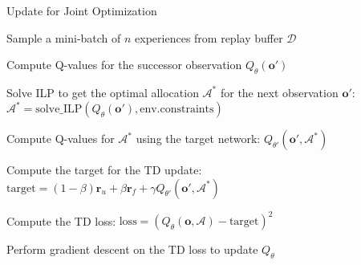 \begin{algorithm}[t]
\caption{Update for Joint Optimization}
\label{alg:JOUpdate}
\begin{algorithmic}[1]

    \State Sample a mini-batch of $n$ experiences from replay buffer $\mathcal{D}$
    
        \State Compute Q-values for the successor observation $Q_\theta(\mathbf{o}')$
        
        \State Solve ILP to get the optimal allocation $\mathcal{A}^*$ for the next observation $\mathbf{o}'$:
        \State \hspace{1em} $\mathcal{A}^* = \text{solve\_ILP}(Q_\theta(\mathbf{o}'), \text{env.constraints})$
        
        \State Compute Q-values for $\mathcal{A}^*$ using the target network:
        \State \hspace{1em} $Q_{\theta'}(\mathbf{o}', \mathcal{A}^*)$
        
        \State Compute the target for the TD update:
        \State \hspace{1em} $\text{target} = (1-\beta)  \mathbf{r}_u + \beta  \mathbf{r}_f + \gamma  Q_{\theta'}(\mathbf{o}', \mathcal{A}^*)$
        
        \State Compute the TD loss:
        \State \hspace{1em} $\text{loss} = \left( Q_\theta(\mathbf{o}, \mathcal{A}) - \text{target} \right)^2$
        
        \State Perform gradient descent on the TD loss to update $Q_\theta$
    \EndFor
\EndFunction
\end{algorithmic}
\end{algorithm}